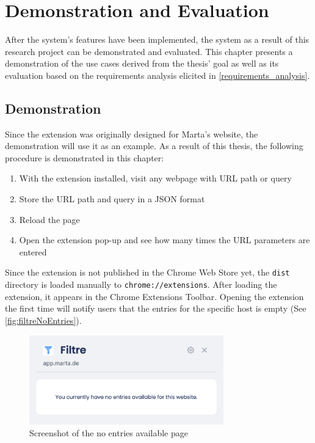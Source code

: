\newpage
\chapter{Demonstration and Evaluation}
After the system's features have been implemented, the system as a result of this research project can be demonstrated and evaluated. This chapter presents a demonstration of the use cases derived from the thesis' goal as well as its evaluation based on the requirements analysis elicited in \autoref{requirements_analysis}.

\section{Demonstration}
Since the extension was originally designed for Marta's website, the demonstration will use it as an example. As a result of this thesis, the following procedure is demonstrated in this chapter:

\begin{enumerate}
  \item With the extension installed, visit any webpage with URL path or query
  \item Store the URL path and query in a JSON format
  \item Reload the page
  \item Open the extension pop-up and see how many times the URL parameters are entered
\end{enumerate}

Since the extension is not published in the Chrome Web Store yet, the \texttt{dist} directory is loaded manually to \verb;chrome://extensions;. After loading the extension, it appears in the Chrome Extensions Toolbar. Opening the extension the first time will notify users that the entries for the specific host is empty (See \autoref{fig:filtreNoEntries}).

\begin{figure}[H]
  \centering
  \includegraphics[width=0.75\textwidth]{assets/Filtre_no_entries.png}
  \caption{Screenshot of the no entries available page}
  \label{fig:filtreNoEntries}
\end{figure}

